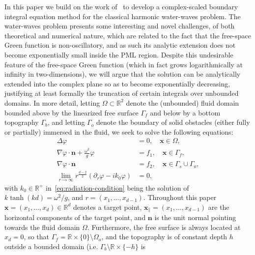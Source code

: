 \documentclass[11pt]{article}
\newcommand{\R}{\mathbb{R}}
\newcommand{\bn}{\mathbf{n}}
\newcommand{\bx}{\mathbf{x}}
\begin{document}
In this paper we build on the work of~\cite{lu2018perfectly} to develop a
complex-scaled boundary integral equation method for the classical harmonic
water-waves problem. The water-waves problem presents some interesting and novel
challenges, of both theoretical and numerical nature, which are related to the
fact that the free-space Green function is non-oscillatory, and as such its
analytic extension does not become exponentially small inside the PML region.
Despite this undesirable feature of the free-space Green function (which in fact
grows logarithmically at infinity in two-dimensions), we will argue that the
solution can be analytically extended into the complex plane so as to become
exponentially decreasing, justifying at least formally the truncation of certain
integrals over unbounded domains. In more detail, letting $\Omega \subset
\mathbb{R}^2$ denote the (unbounded) fluid domain bounded above by the
linearized free surface $\Gamma_f$ and below by a bottom topography $\Gamma_b$,
and letting $\Gamma_o$ denote the boundary of solid obstacles (either fully or
partially) immersed in the fluid, we seek to solve the following equations:
%
\begin{subequations}
  \label{eq:water-waves-system}
  \begin{align}  
    \label{eq:laplace-equation}
    \Delta \varphi &=0, \quad \bx \in \Omega,\\
    \label{eq:free-surface-bc}
    \nabla \varphi \cdot \bn + \frac{\omega^2}{g}\varphi &=f_1, \quad \bx \in \Gamma_f,\\
    \label{eq:solid-bc}  
    \nabla \varphi \cdot \bn &=f_2, \quad \bx \in \Gamma_s \cup \Gamma_o,\\
    \label{eq:radiation-condition}  
    \lim_{r \to \infty} r^{\frac{d-2}{2}} \left( \partial_{r} \varphi - i k_0 \varphi \right) &= 0,
  \end{align}
\end{subequations}
%
with $k_0 \in \mathbb{R}^+$ in~\cref{eq:radiation-condition} being the solution of
$k\tanh(kd) = \omega^2/g$, and $r = (x_1,\ldots,x_{d-1})$. Throughout this paper $\bx = (x_1,\ldots,x_d) \in \R^d$
denotes a target point, $\bx_\parallel = (x_1,\ldots,x_{d-1})$ are the horizontal
components of the target point, and $\bn$ is the unit normal pointing towards
the fluid domain $\Omega$. Furthermore, the free surface is always located at $x_d = 0$, so that $\Gamma_f =
\R \times \{0\} \setminus \Omega_o$, and the topography is of constant depth $h$
outside a bounded domain (i.e. $\Gamma_b \setminus \R \times \{-h\}$ is
\end{document}
